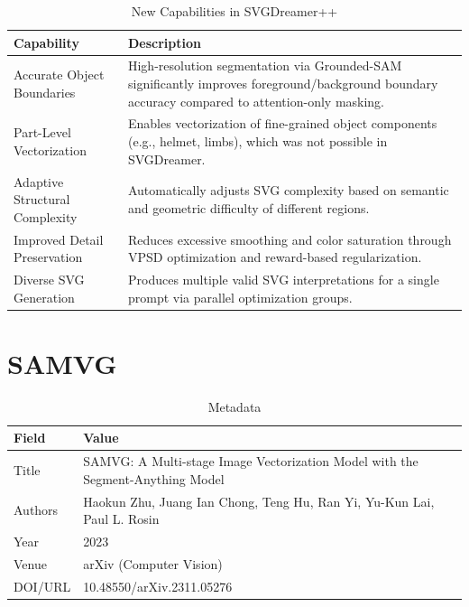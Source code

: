 \begin{table}[h!]
\centering
\caption{New Capabilities in SVGDreamer++}
\begin{tabular}{|l|p{10cm}|}
\hline
\textbf{Capability} & \textbf{Description} \\ \hline

Accurate Object Boundaries &
High-resolution segmentation via Grounded-SAM significantly improves foreground/background boundary accuracy compared to attention-only masking. \\ \hline

Part-Level Vectorization &
Enables vectorization of fine-grained object components (e.g., helmet, limbs), which was not possible in SVGDreamer. \\ \hline

Adaptive Structural Complexity &
Automatically adjusts SVG complexity based on semantic and geometric difficulty of different regions. \\ \hline

Improved Detail Preservation &
Reduces excessive smoothing and color saturation through VPSD optimization and reward-based regularization. \\ \hline

Diverse SVG Generation &
Produces multiple valid SVG interpretations for a single prompt via parallel optimization groups. \\ \hline

\end{tabular}
\end{table}



\chapter{SAMVG}

\begin{table}[h!]
\centering
\caption{Metadata}
\begin{tabular}{|l|l|}
\hline
\textbf{Field} & \textbf{Value} \\ \hline
Title & SAMVG: A Multi-stage Image Vectorization Model with the Segment-Anything Model \\ \hline
Authors & Haokun Zhu, Juang Ian Chong, Teng Hu, Ran Yi, Yu-Kun Lai, Paul L. Rosin \\ \hline
Year & 2023 \\ \hline
Venue & arXiv (Computer Vision) \\ \hline
DOI/URL & 10.48550/arXiv.2311.05276 \\ \hline
\end{tabular}
\end{table}

